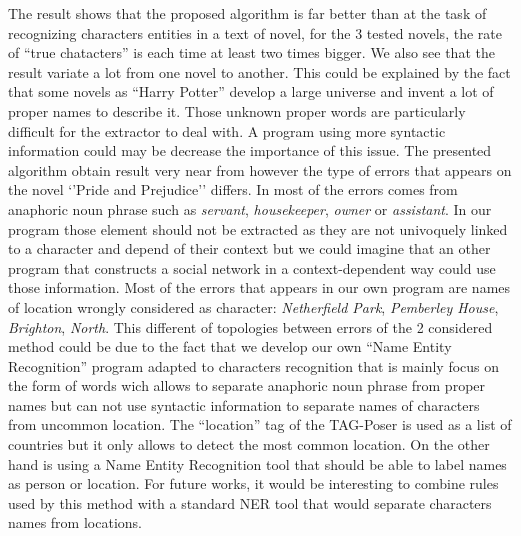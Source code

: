 \documentclass[a4paper, 12pt]{report}
\begin{document}
\begin{table}
\center
\caption{Number of detected character that refers to actual characters(true positive).}\label{tab1}

\end{table}

The result shows that the proposed algorithm is far better than \cite{original} at the task of recognizing characters entities in a text of
novel, for the 3 tested novels, the rate of ``true chatacters'' is each time at least two times bigger. We also see that the result variate
a lot from one novel to another. 
This could be explained by the fact that some novels as ``Harry Potter'' develop a large universe and invent a lot of proper names to describe it. 
Those unknown proper words are particularly difficult for the extractor to deal with. A program using more syntactic information could may be decrease the importance of this issue. 
The presented algorithm obtain result very near from \cite{character_meta} however the type of errors that appears on the novel `'Pride and Prejudice'' differs. 
In \cite{character_meta} most of the errors comes from anaphoric noun phrase such as \textit{servant}, \textit{housekeeper}, \textit{owner} or \textit{assistant}. 
In our program those element should not be extracted as they are not univoquely linked to a character and depend of their context but we could imagine that an other program that constructs a social network in a context-dependent way could use those information. 
Most of the errors that appears in our own  program are names of location wrongly considered as character: \textit{Netherfield Park}, \textit{Pemberley House}, \textit{Brighton}, \textit{North}. 
This different of topologies between errors of the 2 considered method could be due to the fact that
we develop our own ``Name Entity Recognition'' program adapted to characters recognition that is mainly focus on the form of words wich allows to separate anaphoric noun phrase 
from proper names but can not use syntactic information to separate names of characters from uncommon location. 
The ``location'' tag of the TAG-Poser is used as a list of countries but it only allows to detect the most common location. 
On the other hand \cite{structure_clustering} is using a Name Entity Recognition tool that should be able to label names as person or location.
For future works, it would be interesting to combine rules used by this method with a standard NER tool that would separate characters names from locations. \\
\end{document}
